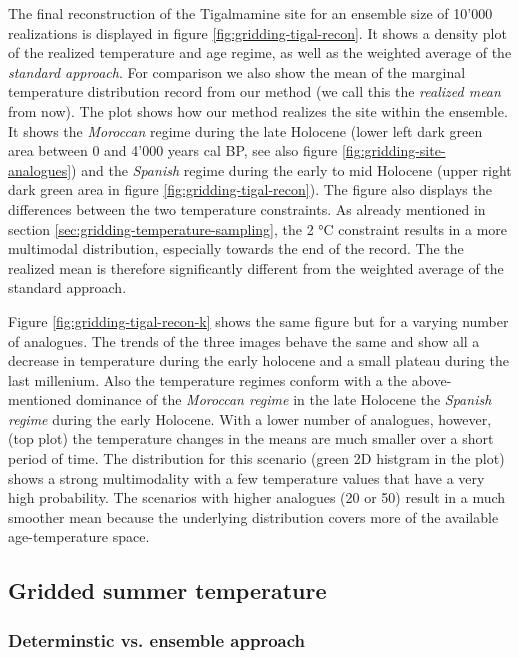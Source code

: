 \documentclass[
11pt, %
english, %
singlespacing, %
headsepline, %
]{MastersDoctoralThesis} %
\begin{document}
\begin{NoHyper}
\begin{refsection}
The final reconstruction of the Tigalmamine site for an ensemble size of 10'000 realizations is displayed in figure \ref{fig:gridding-tigal-recon}. It shows a density plot of the realized temperature and age regime, as well as the weighted average of the \textit{standard approach}. For comparison we also show the mean of the marginal temperature distribution record from our method (we call this the \textit{realized mean} from now). The plot shows how our method realizes the site within the ensemble. It shows the \textit{Moroccan} regime during the late Holocene (lower left dark green area between 0 and 4'000 years cal BP, see also figure \ref{fig:gridding-site-analogues}) and the \textit{Spanish} regime during the early to mid Holocene (upper right dark green area in figure \ref{fig:gridding-tigal-recon}). The figure also displays the differences between the two temperature constraints. As already mentioned in section \ref{sec:gridding-temperature-sampling}, the 2 °C constraint results in a more multimodal distribution, especially towards the end of the record. The the realized mean is therefore significantly different from the weighted average of the standard approach. 

Figure \ref{fig:gridding-tigal-recon-k} shows the same figure but for a varying number of analogues. The trends of the three images behave the same and show all a decrease in temperature during the early holocene and a small plateau during the last millenium. Also the temperature regimes conform with a the above-mentioned dominance of the \textit{Moroccan regime} in the late Holocene the \textit{Spanish regime} during the early Holocene. With a lower number of analogues, however, (top plot) the temperature changes in the means are much smaller over a short period of time. The distribution for this scenario (green 2D histgram in the plot) shows a strong multimodality with a few temperature values that have a very high probability. The scenarios with higher analogues (20 or 50) result in a much smoother mean because the underlying distribution covers more of the available age-temperature space.

\subsection{Gridded summer temperature} \label{sec:gridding-gridded-results}

\subsubsection{Determinstic vs. ensemble approach}


\end{refsection}
\end{NoHyper}
\end{document}
